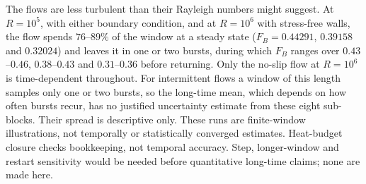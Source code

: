 The flows are less turbulent than their Rayleigh numbers might suggest. At $R=10^5$, with either boundary
condition, and at $R=10^6$ with stress-free walls, the flow spends $76$--$89\%$ of the window at a steady state
($F_B=0.44291$, $0.39158$ and $0.32024$) and leaves it in one or two bursts, during which $F_B$ ranges over
$0.43$--$0.46$, $0.38$--$0.43$ and $0.31$--$0.36$ before returning. Only the no-slip flow at $R=10^6$ is
time-dependent throughout. For intermittent flows a window of this length samples only one or two bursts, so the
long-time mean, which depends on how often bursts recur, has no justified uncertainty estimate from these
eight sub-blocks. Their spread is descriptive only. These runs are finite-window illustrations, not temporally
or statistically converged estimates. Heat-budget closure checks bookkeeping, not temporal accuracy. Step,
longer-window and restart sensitivity would be needed before quantitative long-time claims; none are made here.

